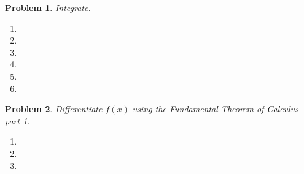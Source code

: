 \documentclass{article}
\renewcommand{\fcProblemRef}{\theproblem.\theenumi}
\newtheorem{problem}{Problem}
\begin{document}
\begin{problem}
Integrate.
\begin{multicols}{2}
\begin{enumerate}[ref={\fcProblemRef}]
\item 
\item %

\item 
\vfill
\item 
\item 
\item 
\end{enumerate}
\end{multicols}
\end{problem}

%





\begin{problem}Differentiate $f(x)$ using the Fundamental Theorem of Calculus part 1.
\begin{enumerate}[ref={\fcProblemRef}]
\item 
\item 
\item 
\end{enumerate}
\end{problem}

\end{document}
